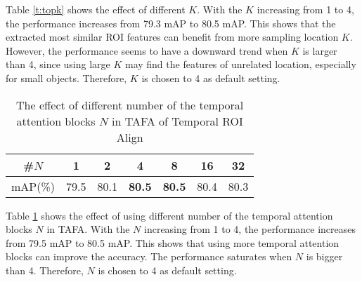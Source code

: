 \documentclass[letterpaper]{article} \usepackage{aaai21}  \usepackage{times}  \usepackage{helvet} \usepackage{courier}  \usepackage[hyphens]{url}  \usepackage{graphicx} \usepackage{hyperref}
\begin{document}
Table \ref{t:topk} shows the effect of different $K$. With the $K$ increasing from 1 to 4, the performance increases from 79.3 mAP to 80.5 mAP. This shows that the extracted most similar ROI features can benefit from more sampling location $K$. However, the performance seems to have a downward trend when $K$ is larger than 4, since using large $K$ may find the features of unrelated location, especially for small objects.
Therefore, $K$ is chosen to 4 as default setting.

\begin{table}[t]
\begin{center}
\begin{tabular}{c|c|c|c|c|c|c}
  \hline
  \hline
  \#$N$ & 1 & 2 & 4 & 8 & 16 & 32\\
  \hline
  mAP(\%) &79.5 & 80.1 & \textbf{80.5}& \textbf{80.5} & 80.4 & 80.3\\
  \hline
  \hline
\end{tabular}
\end{center}
\vspace{-0.2cm}
\caption{The effect of different number of the temporal attention blocks $N$ in TAFA of Temporal ROI Align}
\label{t:attention_maps}
\vspace{-0.2cm}
\end{table}
Table \ref{t:attention_maps} shows the effect of using different number of the temporal attention blocks $N$ in TAFA. With the $N$ increasing from 1 to 4, the performance increases from 79.5 mAP to 80.5 mAP. This shows that using more temporal attention blocks can improve the accuracy. The performance saturates when $N$ is bigger than 4. Therefore, $N$ is chosen to 4 as default setting.
\end{document}
